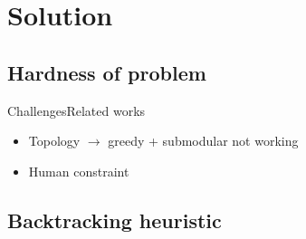\section{Solution}

\subsection{Hardness of problem}

\begin{frame}{Challenges}{Related works}

\begin{itemize}
\item Topology $ \rightarrow $ greedy + submodular not working
\item Human constraint 
\end{itemize}

\end{frame}

\subsection{Backtracking heuristic}

